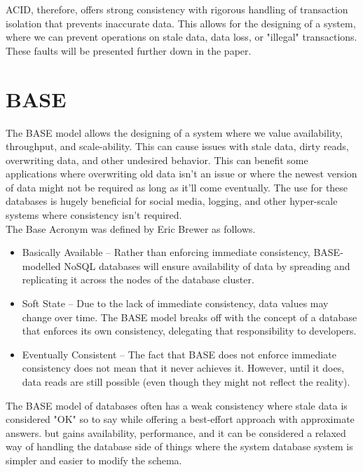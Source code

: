 \documentclass[a4paper,10pt,titlepage]{report}
\begin{document}
ACID, therefore, offers strong consistency with rigorous handling of transaction isolation that prevents inaccurate data. This allows for the designing of a system, where we can prevent operations on stale data, data loss, or "illegal" transactions. These faults will be presented further down in the paper.


\section{BASE}
The BASE model allows the designing of a system where we value availability, throughput, and scale-ability. This can cause issues with stale data, dirty reads, overwriting data, and other undesired behavior. This can benefit some applications where overwriting old data isn't an issue or where the newest version of data might not be required as long as it'll come eventually. The use for these databases is hugely beneficial for social media, logging, and other hyper-scale systems where consistency isn't required.\\
\vspace{5mm}
The Base Acronym was defined by Eric Brewer\cite{brewer2000towards} as follows.

\begin{itemize}
    \item Basically Available – Rather than enforcing immediate consistency, BASE-modelled NoSQL databases will ensure availability of data by spreading and replicating it across the nodes of the database cluster.
    \item Soft State – Due to the lack of immediate consistency, data values may change over time. The BASE model breaks off with the concept of a database that enforces its own consistency, delegating that responsibility to developers.
    \item Eventually Consistent – The fact that BASE does not enforce immediate consistency does not mean that it never achieves it. However, until it does, data reads are still possible (even though they might not reflect the reality).
\end{itemize}

The BASE model of databases often has a weak consistency where stale data is considered "OK" so to say while offering a best-effort approach with approximate answers. but gains availability, performance, and it can be considered a relaxed way of handling the database side of things where the system database system is simpler and easier to modify the schema.
\end{document}

